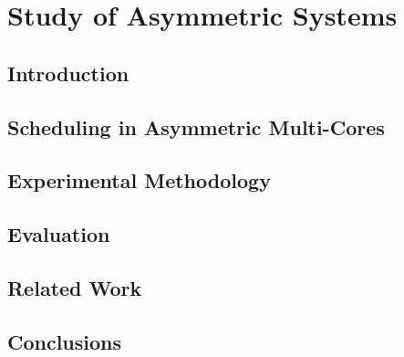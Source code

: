 \chapter{Study of Asymmetric Systems}

\section{Introduction}
\label{sec:intro}


\section{Scheduling in Asymmetric Multi-Cores}
\label{sec:scheduling}


\section{Experimental Methodology}
\label{sec:experimental}


\section{Evaluation}
\label{sec:evaluation}


\section{Related Work}
\label{sec:related}


\section{Conclusions}
\label{sec:conclusions}


% 
